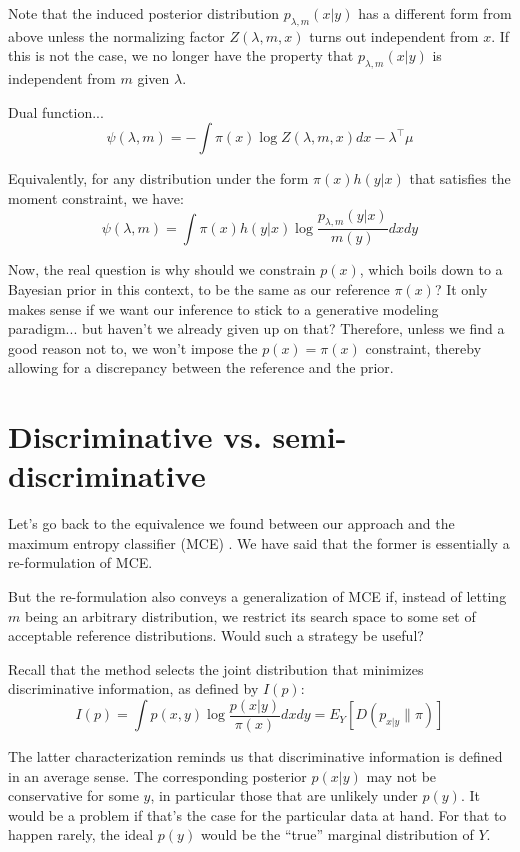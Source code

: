 \documentclass[english]{scrartcl}
\begin{document}
Note that the induced posterior distribution $p_{\lambda,m}(x|y)$ has
a different form from above unless the normalizing factor
$Z(\lambda,m,x)$ turns out independent from $x$. If this is not the
case, we no longer have the property that $p_{\lambda,m}(x|y)$ is
independent from $m$ given $\lambda$.

Dual function...
$$
\psi(\lambda,m) 
=
- \int \pi(x) \log Z(\lambda, m, x) dx
- \lambda^\top \mu
$$

Equivalently, for any distribution under the form $\pi(x)h(y|x)$ that
satisfies the moment constraint, we have:
$$
\psi(\lambda,m) 
=
\int \pi(x) h(y|x) \log \frac{p_{\lambda,m}(y|x)}{m(y)} dxdy
$$

Now, the real question is why should we constrain $p(x)$, which boils
down to a Bayesian prior in this context, to be the same as our
reference $\pi(x)$? It only makes sense if we want our inference to
stick to a generative modeling paradigm... but haven't we already
given up on that? Therefore, unless we find a good reason not to, we
won't impose the $p(x)=\pi(x)$ constraint, thereby allowing for a
discrepancy between the reference and the prior.


\section{Discriminative vs. semi-discriminative}

Let's go back to the equivalence we found between our approach and the
maximum entropy classifier (MCE) \cite{BergerA-96}. We have said that
the former is essentially a re-formulation of MCE.

But the re-formulation also conveys a generalization of MCE if,
instead of letting $m$ being an arbitrary distribution, we restrict
its search space to some set of acceptable reference
distributions. Would such a strategy be useful? 

Recall that the method selects the joint distribution that minimizes
discriminative information, as defined by $I(p)$:
$$
I(p) 
= \int p(x,y)\log\frac{p(x|y)}{\pi(x)} dxdy
= E_Y[D(p_{x|y}\|\pi)]
$$

The latter characterization reminds us that discriminative information
is defined in an average sense. The corresponding posterior $p(x|y)$
may not be conservative for some $y$, in particular those that are
unlikely under $p(y)$. It would be a problem if that's the case for
the particular data at hand. For that to happen rarely, the ideal
$p(y)$ would be the ``true'' marginal distribution of $Y$.
\end{document}
